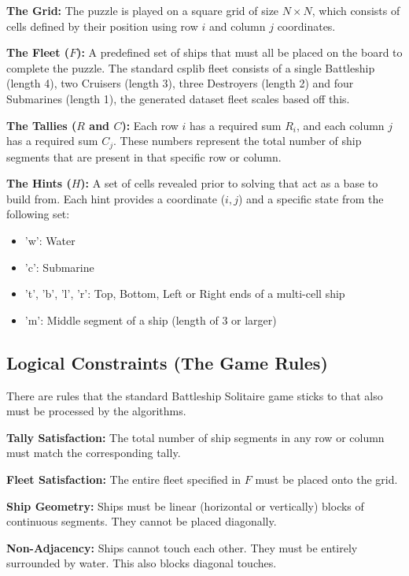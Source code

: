 \textbf{The Grid:} The puzzle is played on a square grid of size $N \times N$, which consists of cells defined by their position using row $i$ and column $j$ coordinates.

\textbf{The Fleet ($F$):} A predefined set of ships that must all be placed on the board to complete the puzzle. The standard \gls{csplib} fleet consists of a single Battleship (length 4), two Cruisers (length 3), three Destroyers (length 2) and four Submarines (length 1), the generated dataset fleet scales based off this.

\textbf{The Tallies ($R$ and $C$):} Each row $i$ has a required sum $R_i$, and each column $j$ has a required sum $C_j$. These numbers represent the total number of ship segments that are present in that specific row or column.

\textbf{The Hints ($H$):} A set of cells revealed prior to solving that act as a base to build from. Each hint provides a coordinate ($i, j$) and a specific state from the following set:
    \begin{itemize}
        \item 'w': Water
        \item 'c': Submarine
        \item 't', 'b', 'l', 'r': Top, Bottom, Left or Right ends of a multi-cell ship
        \item 'm': Middle segment of a ship (length of 3 or larger)
    \end{itemize}

\subsection{Logical Constraints (The Game Rules)}\label{subsec:logical-constraints}
There are rules that the standard Battleship Solitaire game sticks to that also must be processed by the algorithms.

\textbf{Tally Satisfaction:} The total number of ship segments in any row or column must match the corresponding tally.

\textbf{Fleet Satisfaction:} The entire fleet specified in $F$ must be placed onto the grid.

\textbf{Ship Geometry:} Ships must be linear (horizontal or vertically) blocks of continuous segments. They cannot be placed diagonally.

\textbf{Non-Adjacency:} Ships cannot touch each other. They must be entirely surrounded by water. This also blocks diagonal touches.

